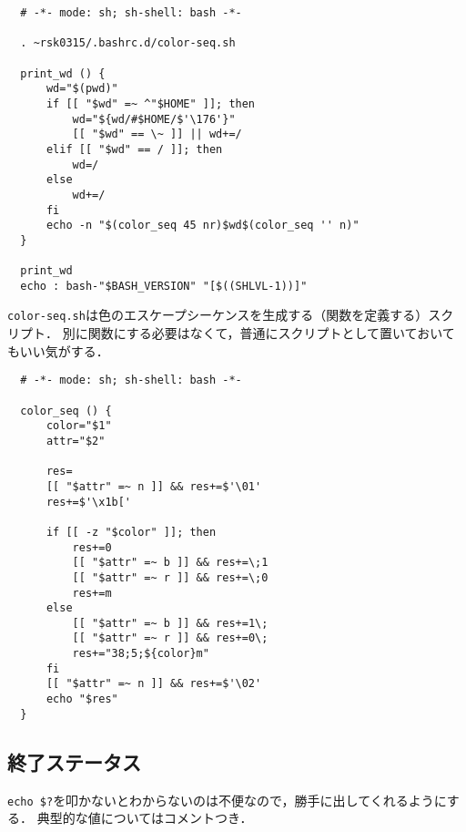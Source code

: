\documentclass[a4paper]{jsarticle}
\begin{document}
\begin{lstlisting}
  # -*- mode: sh; sh-shell: bash -*-
  
  . ~rsk0315/.bashrc.d/color-seq.sh
  
  print_wd () {
      wd="$(pwd)"
      if [[ "$wd" =~ ^"$HOME" ]]; then
          wd="${wd/#$HOME/$'\176'}"
          [[ "$wd" == \~ ]] || wd+=/
      elif [[ "$wd" == / ]]; then
          wd=/
      else
          wd+=/
      fi
      echo -n "$(color_seq 45 nr)$wd$(color_seq '' n)"
  }
  
  print_wd
  echo : bash-"$BASH_VERSION" "[$((SHLVL-1))]"
\end{lstlisting}

\texttt{color-seq.sh}は色のエスケープシーケンスを生成する（関数を定義する）スクリプト．
別に関数にする必要はなくて，普通にスクリプトとして置いておいてもいい気がする．

\begin{lstlisting}
  # -*- mode: sh; sh-shell: bash -*-
  
  color_seq () {
      color="$1"
      attr="$2"
  
      res=
      [[ "$attr" =~ n ]] && res+=$'\01'
      res+=$'\x1b['
  
      if [[ -z "$color" ]]; then
          res+=0
          [[ "$attr" =~ b ]] && res+=\;1
          [[ "$attr" =~ r ]] && res+=\;0
          res+=m
      else
          [[ "$attr" =~ b ]] && res+=1\;
          [[ "$attr" =~ r ]] && res+=0\;
          res+="38;5;${color}m"
      fi
      [[ "$attr" =~ n ]] && res+=$'\02'
      echo "$res"
  }
\end{lstlisting}

\subsection{終了ステータス}
\texttt{echo \$?}を叩かないとわからないのは不便なので，勝手に出してくれるようにする．
典型的な値についてはコメントつき．
\end{document}
